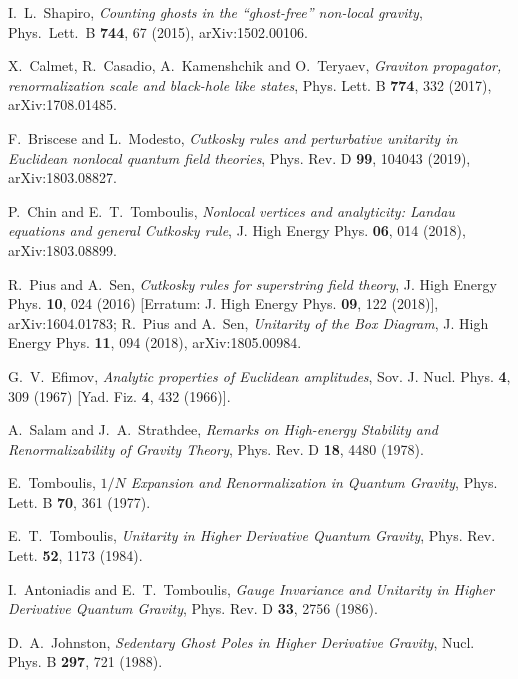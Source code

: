 \documentclass[aps,prd,a4paper,twocolumn,showpacs,showkeys,preprintnumbers,amsmath,amssymb,nofootinbib]{revtex4-2}
\numberwithin{equation}{section}
\begin{document}
\begin{thebibliography}{}
I.~L.~Shapiro,
{\it Counting ghosts in the ``ghost-free'' non-local gravity},
Phys.\ Lett.\ B {\bf 744}, 67 (2015),
arXiv:1502.00106.

X.~Calmet, R.~Casadio, A.~Kamenshchik and O.~Teryaev,
{\it Graviton propagator, renormalization scale and black-hole like states},
Phys. Lett. B \textbf{774}, 332 (2017),
arXiv:1708.01485.

F.~Briscese and L.~Modesto,
{\it Cutkosky rules and perturbative unitarity in Euclidean nonlocal quantum field theories},
Phys. Rev. D \textbf{99}, 104043 (2019),
arXiv:1803.08827.

P.~Chin and E.~T.~Tomboulis,
{\it Nonlocal vertices and analyticity: Landau equations and general Cutkosky rule},
J. High Energy Phys. \textbf{06}, 014 (2018),
arXiv:1803.08899.

R.~Pius and A.~Sen,
{\it Cutkosky rules for superstring field theory},
J. High Energy Phys. \textbf{10}, 024 (2016)
[Erratum: J. High Energy Phys. \textbf{09}, 122 (2018)],
arXiv:1604.01783;
R.~Pius and A.~Sen,
{\it Unitarity of the Box Diagram},
J. High Energy Phys. \textbf{11}, 094 (2018),
arXiv:1805.00984.

G.~V.~Efimov,
{\it Analytic properties of Euclidean amplitudes},
Sov. J. Nucl. Phys. \textbf{4}, 309 (1967)
[Yad. Fiz. \textbf{4}, 432 (1966)].

A.~Salam and J.~A.~Strathdee,
{\it Remarks on High-energy Stability and Renormalizability of Gravity Theory},
Phys. Rev. D \textbf{18}, 4480 (1978).

E.~Tomboulis,
{\it $1/N$ Expansion and Renormalization in Quantum Gravity},
Phys. Lett. B \textbf{70}, 361 (1977).

E.~T.~Tomboulis,
{\it Unitarity in Higher Derivative Quantum Gravity},
Phys. Rev. Lett. \textbf{52}, 1173 (1984).

I.~Antoniadis and E.~T.~Tomboulis,
{\it Gauge Invariance and Unitarity in Higher Derivative Quantum Gravity},
Phys. Rev. D \textbf{33}, 2756 (1986).

D.~A.~Johnston,
{\it Sedentary Ghost Poles in Higher Derivative Gravity},
Nucl. Phys. B \textbf{297}, 721 (1988).


\end{thebibliography}
\end{document}

